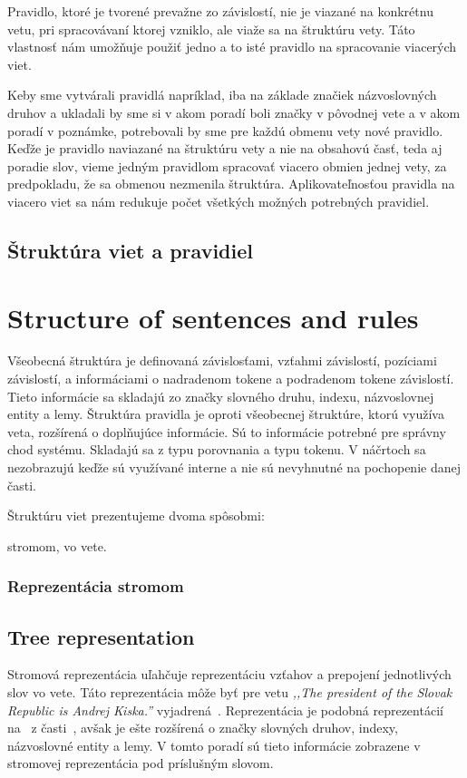 Pravidlo, ktoré je tvorené prevažne zo závislostí, nie je viazané na konkrétnu vetu, pri spracovávaní ktorej vzniklo, ale viaže sa na štruktúru vety. Táto vlastnosť nám umožňuje použiť jedno a to isté pravidlo na spracovanie viacerých viet.

Keby sme vytvárali pravidlá napríklad, iba na základe značiek názvoslovných druhov a ukladali by sme si v akom poradí boli značky v pôvodnej vete a v akom poradí v poznámke, potrebovali by sme pre každú obmenu vety nové pravidlo. Keďže je pravidlo naviazané na štruktúru vety a nie na obsahovú časť, teda aj poradie slov, vieme jedným pravidlom spracovať viacero obmien jednej vety, za predpokladu, že sa obmenou nezmenila štruktúra. Aplikovateľnosťou pravidla na viacero viet sa nám redukuje počet všetkých možných potrebných pravidiel.

%
%
{
	\subsection{Štruktúra viet a pravidiel}
}
{
	\section{Structure of sentences and rules}
}
\label{subsection:structure_of_sentences_and_rules}
Všeobecná štruktúra je definovaná závislosťami, vzťahmi závislostí, pozíciami závislostí, a informáciami o nadradenom tokene a podradenom tokene závislostí. Tieto informácie sa skladajú zo značky slovného druhu, indexu, názvoslovnej entity a lemy. Štruktúra pravidla je oproti všeobecnej štruktúre, ktorú využíva veta, rozšírená o doplňujúce informácie. Sú to informácie potrebné pre správny chod systému. Skladajú sa z typu porovnania a typu tokenu. V náčrtoch sa nezobrazujú keďže sú využívané interne a nie sú nevyhnutné na pochopenie danej časti.

Štruktúru viet prezentujeme dvoma spôsobmi:
\begin{my_itemize}
	\myitem stromom,
	\myitem vo vete.
\end{my_itemize}

%
%
{
	\subsubsection{Reprezentácia stromom}
}
{
	\subsection{Tree representation}
}
\label{subsubsection:structure_tree_representation}
Stromová reprezentácia uľahčuje reprezentáciu vzťahov a prepojení jednotlivých slov vo vete. Táto reprezentácia môže byť pre vetu \textit{,,The president of the Slovak Republic is Andrej Kiska.''} vyjadrená~. Reprezentácia je podobná reprezentácií na~ z časti~, avšak je ešte rozšírená o značky slovných druhov, indexy, názvoslovné entity a lemy. V tomto poradí sú tieto informácie zobrazene v stromovej reprezentácia pod príslušným slovom.

